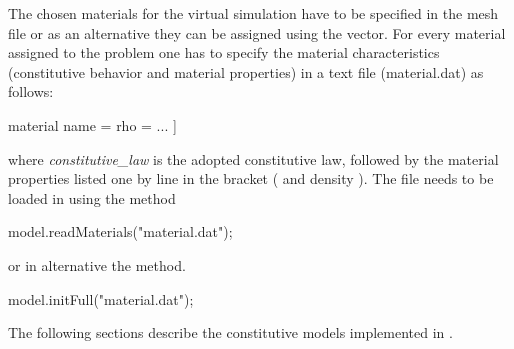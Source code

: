 The chosen materials for the virtual simulation have to be specified in the mesh
file or as an alternative they can be assigned using the
 vector.  For every material assigned to the problem one
has to specify the material characteristics (constitutive behavior and material
properties) in a text file (\eg material.dat) as follows:
\begin{cpp}
  material %
  name = %
  rho = %
  ...
  ]
\end{cpp}
 where \emph{constitutive\_law} is the adopted
constitutive law, followed by the material properties listed one by line in the
bracket (\eg {} and density ). The file needs to be loaded in
\akantu using the  method
\begin{cpp}
  model.readMaterials("material.dat");
\end{cpp}
or in alternative the  method.
\begin{cpp}
  model.initFull("material.dat");
\end{cpp}
The following sections describe the constitutive models implemented in \akantu.

